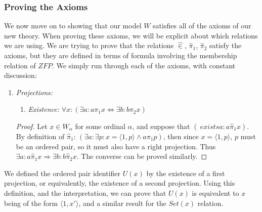 \documentclass[11pt]{report}
\newcommand{\pleft}{\mathrel{\pi_1}}
\newcommand{\pright}{\mathrel{\pi_2}}
\newcommand{\pair}[2]{\langle #1,#2 \rangle}
\newcommand{\zin}{\mathrel{\widehat{\in}}}
\newcommand{\zpright}{\mathrel{\widehat{\pi}_2}}
\newcommand{\zpleft}{\mathrel{\widehat{\pi}_1}}
\theoremstyle{definition}
\theoremstyle{theorem}
\theoremstyle{lemma}
\begin{document}
\subsubsection{Proving the Axioms}
We now move on to showing that our model $W$ satisfies all of the axioms of our new theory. When proving these axioms, we will be explicit about which relations we are using. We are trying to prove that the relations $\zin$, $\zpleft$, $\zpright$ satisfy the axioms, but they are defined in terms of formula involving the membership relation of $\mathit{ZFP}$. We simply run through each of the axioms, with constant discussion:

\begin{enumerate}[series=axiomlist, label=\Roman*.]
  \item \textit{Projections:}
        \begin{enumerate}[series=sublist, label=(\roman*)]
        \item \textit{Existence:} $\forall x: (\exists a: a\pleft x \Leftrightarrow \exists b: b\pright x)$
        \end{enumerate}
        \begin{proof}
        Let $x\in W_\alpha$ for some ordinal $\alpha$, and suppose that $(\    exists a: a\zpleft x)$.
        By definition of $\zpleft$: $(\exists a: \exists p: x = \pair{1}{p} \wedge a \pleft p)$, then since $x = \pair{1}{p}$, $p$ must be an ordered pair, so it must also have a right projection.
        Thus $\exists a: a\zpleft x \Rightarrow \exists b: b\zpright x$.
        The converse can be proved similarly.
      \end{proof}

\end{enumerate}
We defined the ordered pair identifier $U(x)$ by the existence of a first projection, or equivalently, the existence of a second projection. Using this definition, and the interpretation, we can prove that $U(x)$ is equivalent to $x$ being of the form $\pair{1}{x'}$, and a similar result for the $\mathit{Set}(x)$ relation.
\end{document}
